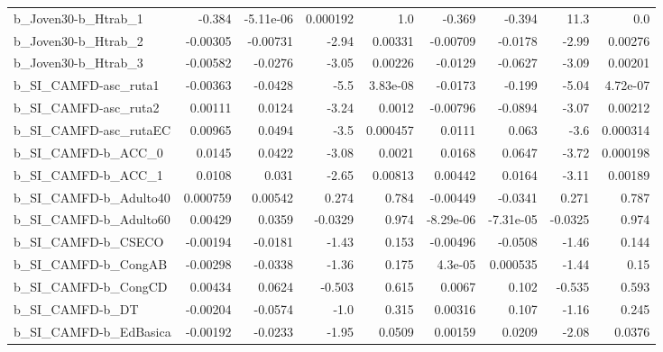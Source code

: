\begin{tabular}{lrrrrrrrr}
b\_Joven30-b\_Htrab\_1        &      -0.384 &    -5.11e-06 &  0.000192 &      1.0 &     -0.369 &      -0.394 &         11.3 &           0.0 \\
b\_Joven30-b\_Htrab\_2        &    -0.00305 &     -0.00731 &     -2.94 &  0.00331 &   -0.00709 &     -0.0178 &        -2.99 &       0.00276 \\
b\_Joven30-b\_Htrab\_3        &    -0.00582 &      -0.0276 &     -3.05 &  0.00226 &    -0.0129 &     -0.0627 &        -3.09 &       0.00201 \\
b\_SI\_CAMFD-asc\_ruta1       &    -0.00363 &      -0.0428 &      -5.5 & 3.83e-08 &    -0.0173 &      -0.199 &        -5.04 &      4.72e-07 \\
b\_SI\_CAMFD-asc\_ruta2       &     0.00111 &       0.0124 &     -3.24 &   0.0012 &   -0.00796 &     -0.0894 &        -3.07 &       0.00212 \\
b\_SI\_CAMFD-asc\_rutaEC      &     0.00965 &       0.0494 &      -3.5 & 0.000457 &     0.0111 &       0.063 &         -3.6 &      0.000314 \\
b\_SI\_CAMFD-b\_ACC\_0         &      0.0145 &       0.0422 &     -3.08 &   0.0021 &     0.0168 &      0.0647 &        -3.72 &      0.000198 \\
b\_SI\_CAMFD-b\_ACC\_1         &      0.0108 &        0.031 &     -2.65 &  0.00813 &    0.00442 &      0.0164 &        -3.11 &       0.00189 \\
b\_SI\_CAMFD-b\_Adulto40      &    0.000759 &      0.00542 &     0.274 &    0.784 &   -0.00449 &     -0.0341 &        0.271 &         0.787 \\
b\_SI\_CAMFD-b\_Adulto60      &     0.00429 &       0.0359 &   -0.0329 &    0.974 &  -8.29e-06 &   -7.31e-05 &      -0.0325 &         0.974 \\
b\_SI\_CAMFD-b\_CSECO         &    -0.00194 &      -0.0181 &     -1.43 &    0.153 &   -0.00496 &     -0.0508 &        -1.46 &         0.144 \\
b\_SI\_CAMFD-b\_CongAB        &    -0.00298 &      -0.0338 &     -1.36 &    0.175 &    4.3e-05 &    0.000535 &        -1.44 &          0.15 \\
b\_SI\_CAMFD-b\_CongCD        &     0.00434 &       0.0624 &    -0.503 &    0.615 &     0.0067 &       0.102 &       -0.535 &         0.593 \\
b\_SI\_CAMFD-b\_DT            &    -0.00204 &      -0.0574 &      -1.0 &    0.315 &    0.00316 &       0.107 &        -1.16 &         0.245 \\
b\_SI\_CAMFD-b\_EdBasica      &    -0.00192 &      -0.0233 &     -1.95 &   0.0509 &    0.00159 &      0.0209 &        -2.08 &        0.0376 \\

\end{tabular}
